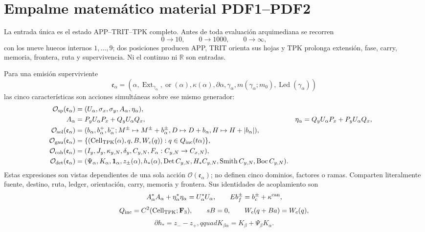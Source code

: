 
\section*{Empalme matemático material PDF1--PDF2}

La entrada única es el estado APP--TRIT--TPK completo. Antes de toda
evaluación arquimediana se recorren
\[
 0\longrightarrow10,\qquad 0\longrightarrow1000,
 \qquad 0\longrightarrow\infty,
\]
con los nueve huecos internos \(1,\ldots,9\); dos posiciones producen APP,
TRIT orienta sus hojas y TPK prolonga extensión, fase, carry, memoria,
frontera, ruta y supervivencia. Ni el continuo ni \(\mathbb R\) son entradas.

Para una emisión superviviente
\[
 \mathfrak e_\alpha=
 (\alpha,\operatorname{Ext}_{\gamma_\alpha},\operatorname{or}(\alpha),
 \kappa(\alpha),\partial\alpha,\gamma_\alpha,
 m(\gamma_\alpha;m_0),\operatorname{Led}(\gamma_\alpha))
\]
las cinco características son acciones simultáneas sobre ese mismo
generador:
\begin{align*}
 \mathcal O_{\rm sp}(\mathfrak e_\alpha)
  &=(U_\alpha,\sigma_x,\sigma_y,A_\alpha,\eta_\alpha),\\
 A_\alpha&=P_yU_\alpha P_x+Q_yU_\alpha Q_x,
 &\eta_\alpha&=Q_yU_\alpha P_x+P_yU_\alpha Q_x,\\
 \mathcal O_{\rm sol}(\mathfrak e_\alpha)
  &=(b_\alpha,b_\alpha^+,b_\alpha^-;
  M^\pm\mapsto M^\pm+b_\alpha^\pm,
  D\mapsto D+b_\alpha,H\mapsto H+|b_\alpha|),\\
 \mathcal O_{\rm gau}(\mathfrak e_\alpha)
  &=\{(\operatorname{Cell}_{\rm TPK}(\alpha),q,B,W_c(q)):
      q\in Q_{\rm inc}(t\alpha)\},\\
 \mathcal O_{\rm coh}(\mathfrak e_\alpha)
  &=(I_y,J_y,\kappa_{y,N},\delta_y,C_{y,N},
      F_\alpha:C_{y,N}\to C_{x,N}),\\
 \mathcal O_{\rm det}(\mathfrak e_\alpha)
  &=(\Psi_\alpha,K_\alpha,\mathbf1_\alpha,z_\pm(\alpha),h_*(\alpha),
  \operatorname{Det}C_{y,N},H_*C_{y,N},\operatorname{Smith}C_{y,N},
  \operatorname{Boc}C_{y,N}).
\end{align*}
Estas expresiones son vistas dependientes de una sola acción
\(\mathcal O(\mathfrak e_\alpha)\); no definen cinco dominios, factores o
ramas. Comparten literalmente fuente, destino, ruta, ledger, orientación,
carry, memoria y frontera. Sus identidades de acoplamiento son
\[
 A_\alpha^*A_\alpha+\eta_\alpha^*\eta_\alpha=U_\alpha^*U_\alpha,
 \qquad E b_f^\pm=b_c^\pm+\kappa^{\rm can},
\]
\[
 Q_{\rm inc}=C^2(\operatorname{Cell}_{\rm TPK};\mathbf F_3),
 \qquad sB=0,\qquad W_c(q+Ba)=W_c(q),
\]
\[
 \partial h_*=z_--z_+,qquad
 K_{\beta\alpha}=K_\beta+\Psi_\beta K_\alpha.
\]

